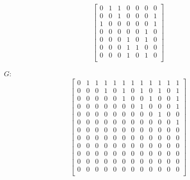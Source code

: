 \begin{center}
\end{center}
\fi


\[\left[
	\begin{array}{ccccccc}
	0& 1& 1& 0& 0& 0& 0 \\
	0& 0& 1& 0& 0& 0& 1 \\
	1& 0& 0& 0& 0& 0& 1 \\
	0& 0& 0& 0& 0& 1& 0 \\
	0& 0& 0& 1& 0& 1& 0 \\
	0& 0& 0& 1& 1& 0& 0 \\
	0& 0& 0& 1& 0& 1& 0 \\
	\end{array}
\right]\]


\(G\):
\[\left[
	\begin{array}{cccccccccccc}
	0& 1& 1& 1& 1& 1& 1& 1& 1& 1& 1& 1 \\
	0& 0& 0& 1& 0& 1& 0& 1& 0& 1& 0& 1 \\
	0& 0& 0& 0& 0& 1& 0& 0& 1& 0& 0& 1 \\
	0& 0& 0& 0& 0& 0& 0& 1& 0& 0& 0& 1 \\
	0& 0& 0& 0& 0& 0& 0& 0& 0& 1& 0& 0 \\
	0& 0& 0& 0& 0& 0& 0& 0& 0& 0& 0& 1 \\
	0& 0& 0& 0& 0& 0& 0& 0& 0& 0& 0& 0 \\
	0& 0& 0& 0& 0& 0& 0& 0& 0& 0& 0& 0 \\
	0& 0& 0& 0& 0& 0& 0& 0& 0& 0& 0& 0 \\
	0& 0& 0& 0& 0& 0& 0& 0& 0& 0& 0& 0 \\
	0& 0& 0& 0& 0& 0& 0& 0& 0& 0& 0& 0 \\
	0& 0& 0& 0& 0& 0& 0& 0& 0& 0& 0& 0 \\
	\end{array}
\right]\]

